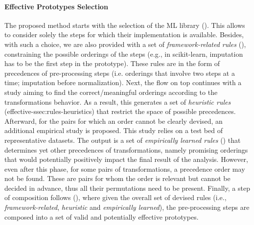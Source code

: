 \paragraph{Effective Prototypes Selection} The proposed method starts with the selection of the ML library ().
This allows to consider solely the steps for which their implementation is available.
Besides, with such a choice, we are also provided with a set of \textit{framework-related rules} (), constraining the possible orderings of the steps (e.g., in scikit-learn, imputation has to be the first step in the prototype).
These rules are in the form of precedences of pre-processing steps (i.e. orderings that involve two steps at a time; imputation before normalization).
Next, the flow on top continues with a study
aiming to find the correct/meaningful orderings according to
the transformations behavior.
As a result, this generates a set of \textit{heuristic rules} ({effective-ssec:rules-heuristics}) that restrict the space of possible precedences.
Afterward, for the pairs for which an order cannot be clearly devised, an additional empirical study is proposed.
This study relies on a test bed of representative datasets.
The output is a set of \textit{empirically learned rules} () that determines yet other precedences of transformations, namely promising orderings that would potentially positively impact the final result of the analysis.
However, even after this phase, for some pairs of transformations, a precedence order may not be found.
These are pairs for whom the order is relevant but cannot be decided in advance, thus all their permutations need to be present.
Finally, a step of composition follows  (), where given the overall set of devised rules (i.e., \textit{framework-related}, \textit{heuristic} and \textit{empirically learned}), the pre-processing steps are composed into a set of valid and potentially effective prototypes.


